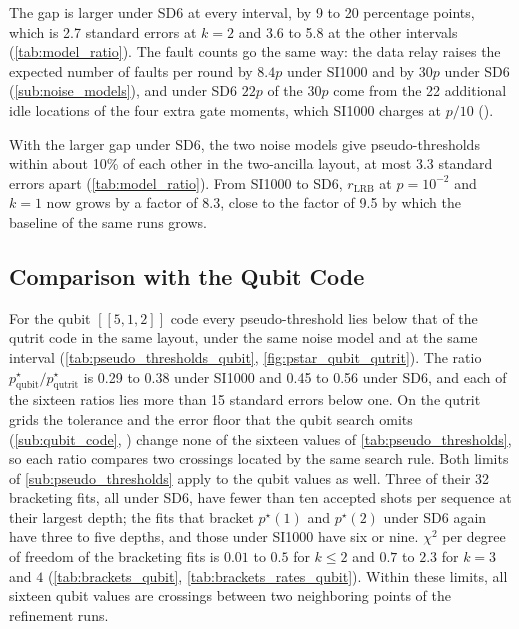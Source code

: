 The gap is larger under SD6 at every interval, by 9 to 20 percentage points, which is 2.7 standard errors at $k = 2$ and 3.6 to 5.8 at the other intervals (\autoref{tab:model_ratio}). The fault counts go the same way: the data relay raises the expected number of faults per round by $8.4p$ under SI1000 and by $30p$ under SD6 (\autoref{sub:noise_models}), and under SD6 $22p$ of the $30p$ come from the 22 additional idle locations of the four extra gate moments, which SI1000 charges at $p/10$ ().

With the larger gap under SD6, the two noise models give pseudo-thresholds within about 10\% of each other in the two-ancilla layout, at most 3.3 standard errors apart (\autoref{tab:model_ratio}). From SI1000 to SD6, $r_{\mathrm{LRB}}$ at $p = 10^{-2}$ and $k = 1$ now grows by a factor of 8.3, close to the factor of 9.5 by which the baseline of the same runs grows.

\subsection{Comparison with the Qubit Code}
\label{sub:qubit_comparison}

For the qubit $[[5,1,2]]$ code every pseudo-threshold lies below that of the qutrit code in the same layout, under the same noise model and at the same interval (\autoref{tab:pseudo_thresholds_qubit}, \autoref{fig:pstar_qubit_qutrit}). The ratio $p^\star_{\mathrm{qubit}}/p^\star_{\mathrm{qutrit}}$ is 0.29 to 0.38 under SI1000 and 0.45 to 0.56 under SD6, and each of the sixteen ratios lies more than 15 standard errors below one. On the qutrit grids the tolerance and the error floor that the qubit search omits (\autoref{sub:qubit_code}, ) change none of the sixteen values of \autoref{tab:pseudo_thresholds}, so each ratio compares two crossings located by the same search rule. Both limits of \autoref{sub:pseudo_thresholds} apply to the qubit values as well. Three of their 32 bracketing fits, all under SD6, have fewer than ten accepted shots per sequence at their largest depth; the fits that bracket $p^\star(1)$ and $p^\star(2)$ under SD6 again have three to five depths, and those under SI1000 have six or nine. $\chi^2$ per degree of freedom of the bracketing fits is $0.01$ to $0.5$ for $k \le 2$ and $0.7$ to $2.3$ for $k = 3$ and $4$ (\autoref{tab:brackets_qubit}, \autoref{tab:brackets_rates_qubit}). Within these limits, all sixteen qubit values are crossings between two neighboring points of the refinement runs.


